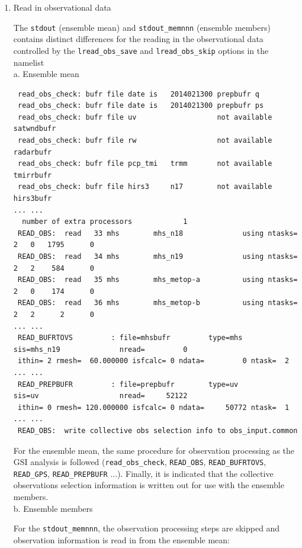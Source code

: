 \begin{enumerate}
\item Read in observational data

The \verb|stdout| (ensemble mean) and \verb|stdout_memnnn| (ensemble members) contains distinct differences for the reading in the observational data controlled by the \verb|lread_obs_save| and \verb|lread_obs_skip| options in the namelist \\

a. Ensemble mean
\begin{scriptsize}
\begin{verbatim}
 read_obs_check: bufr file date is   2014021300 prepbufr q
 read_obs_check: bufr file date is   2014021300 prepbufr ps
 read_obs_check: bufr file uv                   not available satwndbufr
 read_obs_check: bufr file rw                   not available radarbufr
 read_obs_check: bufr file pcp_tmi   trmm       not available tmirrbufr
 read_obs_check: bufr file hirs3     n17        not available hirs3bufr
... ...
  number of extra processors            1
 READ_OBS:  read   33 mhs        mhs_n18              using ntasks=   2   0   1795      0
 READ_OBS:  read   34 mhs        mhs_n19              using ntasks=   2   2    584      0
 READ_OBS:  read   35 mhs        mhs_metop-a          using ntasks=   2   0    174      0
 READ_OBS:  read   36 mhs        mhs_metop-b          using ntasks=   2   2      2      0
... ...
 READ_BUFRTOVS         : file=mhsbufr         type=mhs        sis=mhs_n19              nread=         0
 ithin= 2 rmesh=  60.000000 isfcalc= 0 ndata=         0 ntask=  2
... ...
 READ_PREPBUFR         : file=prepbufr        type=uv         sis=uv                   nread=     52122
 ithin= 0 rmesh= 120.000000 isfcalc= 0 ndata=     50772 ntask=  1
... ...
 READ_OBS:  write collective obs selection info to obs_input.common
\end{verbatim}
\end{scriptsize}

For the ensemble mean, the same procedure for observation processing as the GSI analysis is followed (\verb|read_obs_check|, \verb|READ_OBS|, \verb|READ_BUFRTOVS|, \verb|READ_GPS|, \verb|READ_PREPBUFR| ...). Finally, it is indicated that the collective observations selection information is written out for use with the ensemble members.\\

b. Ensemble members

For the \verb|stdout_memnnn|, the observation processing steps are skipped and observation information is read in from the ensemble mean:


\end{enumerate}
